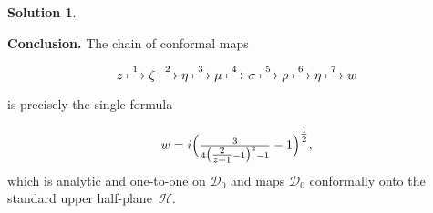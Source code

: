 \documentclass[12pt]{article}
\theoremstyle{definition} %
\newtheorem{solution}{Solution}
\theoremstyle{plain} %
\begin{document}
\begin{solution}
\begin{enumerate}[label=\textbf{Step \arabic*:}, itemsep=1.4ex]
          \end{enumerate}
          
          \medskip
          \noindent
          \textbf{Conclusion.}\;
          The chain of conformal maps  
          
          \[
          z\xmapsto{\;1\;}\zeta
          \xmapsto{\;2\;}\eta
          \xmapsto{\;3\;}\mu
          \xmapsto{\;4\;}\sigma
          \xmapsto{\;5\;}\rho
          \xmapsto{\;6\;}\eta
          \xmapsto{\;7\;}w
          \]
          
          is precisely the single formula  
          
          \[
          w
            = i\Bigl(
                  \tfrac{3}{4\bigl(\tfrac{2}{z+1}-1\bigr)^{2}-1}-1
                \Bigr)^{\tfrac12},
          \]
          which is analytic and one-to-one on $\mathcal D_0$
          and maps $\mathcal D_0$ conformally onto the
          standard upper half-plane~$\mathcal H$.
          \end{solution}
\end{document}
